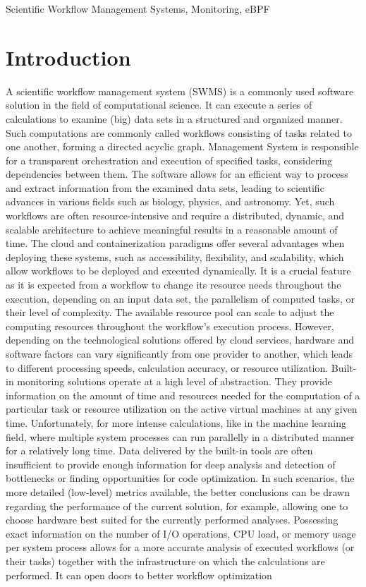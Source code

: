 \documentclass[lettersize,journal]{IEEEtran}
\begin{document}
	\begin{IEEEkeywords}
		Scientific Workflow Management Systems, Monitoring, eBPF
	\end{IEEEkeywords}
	
	\section{Introduction}
	A scientific workflow management system (SWMS) is a commonly used software solution in the field of computational science. It can execute a series of calculations to examine (big) data sets in a structured and organized manner. Such computations are commonly called workflows consisting of tasks related to one another, forming a directed acyclic graph. Management System is responsible for a transparent orchestration and execution of specified tasks, considering dependencies between them. The software allows for an efficient way to process and extract information from the examined data sets, leading to scientific advances in various fields such as biology, physics, and astronomy\cite{challengesSW}. Yet, such workflows are often resource-intensive and require a distributed, dynamic, and scalable architecture to achieve meaningful results in a reasonable amount of time. The cloud and containerization paradigms offer several advantages when deploying these systems, such as accessibility, flexibility, and scalability, which allow workflows to be deployed and executed dynamically. It is a crucial feature as it is expected from a workflow to change its resource needs throughout the execution, depending on an input data set, the parallelism of computed tasks, or their level of complexity. The available resource pool can scale to adjust the computing resources throughout the workflow's execution process. However, depending on the technological solutions offered by cloud services, hardware and software factors can vary significantly from one provider to another, which leads to different processing speeds, calculation accuracy, or resource utilization\cite{compareCloud}. Built-in monitoring solutions operate at a high level of abstraction. They provide information on the amount of time and resources needed for the computation of a particular task or resource utilization on the active virtual machines at any given time. Unfortunately, for more intense calculations, like in the machine learning field, where multiple system processes can run parallelly in a distributed manner for a relatively long time. Data delivered by the built-in tools are often insufficient to provide enough information for deep analysis and detection of bottlenecks or finding opportunities for code optimization. In such scenarios, the more detailed (low-level) metrics available, the better conclusions can be drawn regarding the performance of the current solution, for example, allowing one to choose hardware best suited for the currently performed analyses. Possessing exact information on the number of I/O operations, CPU load, or memory usage per system process allows for a more accurate analysis of executed workflows (or their tasks) together with the infrastructure on which the calculations are performed. It can open doors to better workflow optimization 
\end{document}
